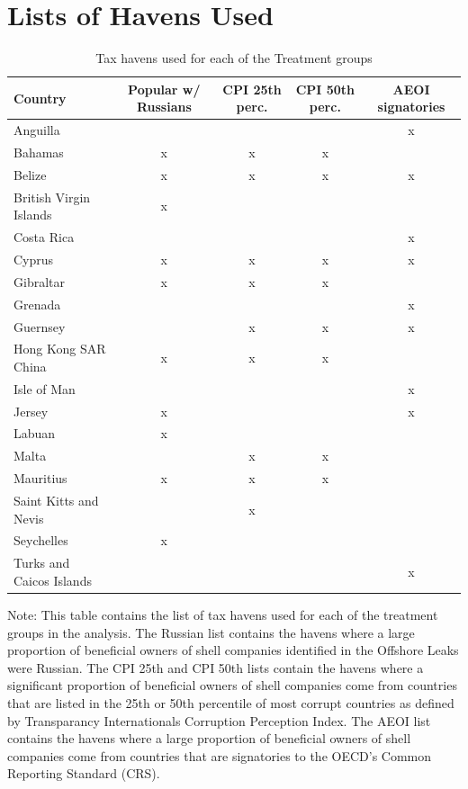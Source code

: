 \documentclass{article}
\begin{document}
\section{Lists of Havens Used}

\begin{table}[H]
\centering
\noindent
\begin{adjustbox}{width=0.9\textwidth}
\begin{threeparttable}
\begin{tabular}{lcccc}
\hline
\textbf{Country} & \textbf{Popular w/ Russians} & \textbf{CPI 25th perc.} & \textbf{CPI 50th perc.} & \textbf{AEOI signatories} \\
\hline
Anguilla  &  &  &  & x\\
Bahamas & x & x & x & \\
Belize & x & x & x & x \\
British Virgin Islands  & x &  &  & \\
Costa Rica  &  &  &  & x\\
Cyprus & x & x & x & x \\
Gibraltar & x & x & x & \\
Grenada &  &  &  & x \\
Guernsey &  & x & x & x \\
Hong Kong SAR China & x & x & x & \\
Isle of Man &  &  &  & x \\
Jersey & x &  &  & x \\
Labuan  & x &  &  &  \\
Malta  &  & x & x & \\
Mauritius  & x & x & x &  \\
Saint Kitts and Nevis  &  & x &  &  \\
Seychelles  & x &  &  & \\
Turks and Caicos Islands &  &  &  & x \\
\hline
\end{tabular}
\begin{tablenotes}
    \item Note: This table contains the list of tax havens used for each of the treatment groups in the analysis. The Russian list contains the havens where a large proportion of beneficial owners of shell companies identified in the Offshore Leaks were Russian. The CPI 25th and CPI 50th lists contain the havens where a significant proportion of beneficial owners of shell companies come from countries that are listed in the 25th or 50th percentile of most corrupt countries as defined by Transparancy Internationals Corruption Perception Index. The AEOI list contains the havens where a large proportion of beneficial owners of shell companies come from countries that are signatories to the OECD's Common Reporting Standard (CRS). 
\end{tablenotes}
\end{threeparttable}
\end{adjustbox}
\caption{Tax havens used for each of the Treatment groups}
\label{tab:your_label_here}
\end{table}
\end{document}
